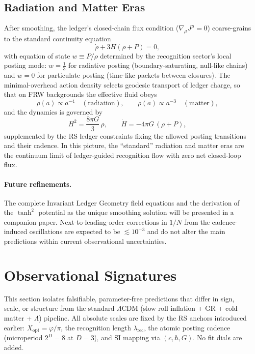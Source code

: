 \documentclass[11pt]{article}
\theoremstyle{definition}
\theoremstyle{remark}
\begin{document}
\subsection{Radiation and Matter Eras}
After smoothing, the ledger’s closed-chain flux condition (\(\nabla_\mu J^\mu=0\)) coarse-grains to the standard continuity equation
\begin{equation}
  \dot\rho + 3H(\rho+P)=0,
  \label{eq:continuity}
\end{equation}
with equation of state \(w\equiv P/\rho\) determined by the recognition sector’s local posting mode: \(w=\tfrac{1}{3}\) for radiative posting (boundary-saturating, null-like chains) and \(w=0\) for particulate posting (time-like packets between closures). The minimal-overhead action density selects geodesic transport of ledger charge, so that on FRW backgrounds the effective fluid obeys
\begin{equation}
  \rho(a)\propto a^{-4} \quad (\text{radiation}), 
  \qquad
  \rho(a)\propto a^{-3} \quad (\text{matter}),
  \label{eq:eras}
\end{equation}
and the dynamics is governed by
\begin{equation}
  H^2=\frac{8\pi G}{3}\,\rho, 
  \qquad 
  \dot H = -4\pi G\,(\rho+P),
  \label{eq:friedmann}
\end{equation}
supplemented by the RS ledger constraints fixing the allowed posting transitions and their cadence. In this picture, the “standard” radiation and matter eras are the continuum limit of ledger-guided recognition flow with zero net closed-loop flux.

\paragraph{Future refinements.}
The complete Invariant Ledger Geometry field equations and the derivation of the \(\tanh^2\) potential as the unique smoothing solution will be presented in a companion paper. Next-to-leading-order corrections in \(1/N\) from the cadence-induced oscillations are expected to be \(\lesssim 10^{-3}\) and do not alter the main predictions within current observational uncertainties.

\section{Observational Signatures}

This section isolates falsifiable, parameter-free predictions that differ in sign, scale, or structure from the standard \(\Lambda\)CDM (slow-roll inflation + GR + cold matter + \(\Lambda\)) pipeline. All absolute scales are fixed by the RS anchors introduced earlier: \(X_{\mathrm{opt}}=\varphi/\pi\), the recognition length \(\lambda_{\mathrm{rec}}\), the atomic posting cadence (microperiod \(2^D=8\) at \(D=3\)), and SI mapping via \((c,\hbar,G)\). No fit dials are added.
\end{document}
